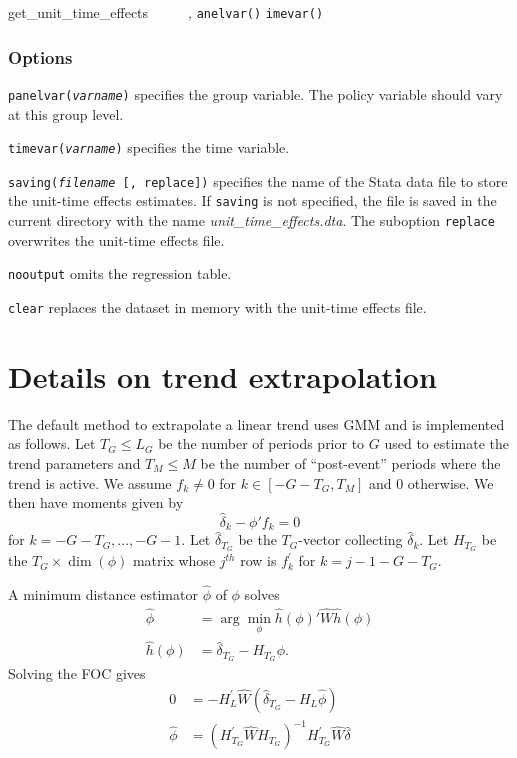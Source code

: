 \documentclass[12pt]{article}
\begin{document}
\begin{stsyntax}
	get\_unit\_time\_effects
	\depvar\
	\optindepvars\
	\optif\
	\optin\
	\optweight\
	\emph{,}
	\texttt{anelvar(\varname)}
	\texttt{imevar(\varname)}\
\end{stsyntax}

\subsubsection{Options}
\hangpara
\texttt{panelvar({\it varname})} specifies the group variable.
The policy variable should vary at this group level.

\hangpara
\texttt{timevar({\it varname})} specifies the time variable.

\hangpara
\texttt{saving({\it filename} [, replace])} specifies the name of the Stata data file to store the unit-time effects estimates.
If \texttt{saving} is not specified, the file is saved in the current directory with the name {\it unit\_time\_effects.dta}.
The suboption \texttt{replace} overwrites the unit-time effects file.

\hangpara
\texttt{nooutput} omits the regression table.

\hangpara
\texttt{clear} replaces the dataset in memory with the unit-time effects file.









\section{Details on trend extrapolation}
\label{sec:app_trend}

The default method to extrapolate a linear trend uses GMM and is implemented as follows.
Let $T_G \leq L_G$ be the number of periods prior to $G$ used to estimate the trend parameters and $T_M \leq M$ be the number of ``post-event'' periods where the trend is active.
We assume $f_k \neq 0$ for $k \in \left[-G-T_G,T_M \right]$ and $0$ otherwise.
We then have moments given by
\[
\widehat{\delta}_{k}-\phi'f_{k}=0
\]
for $k=-G-T_G,...,-G-1$. Let $\widehat{\delta}_{T_G}$ be the $T_{G}$-vector
collecting $\widehat{\delta}_{k}$. Let $H_{T_G}$ be the $T_{G}\times\dim\left(\phi\right)$
matrix whose $j^{th}$ row is $f_{k}^{'}$ for $k=j-1-G-T_{G}$.

A minimum distance estimator $\widehat{\phi}$ of $\phi$ solves
\begin{align*}
\widehat{\phi} & =\arg\min_{\phi}\widehat{h}\left(\phi\right)'\widehat{W}\widehat{h}\left(\phi\right)\\
\widehat{h}\left(\phi\right) & =\widehat{\delta}_{T_G}-H_{T_G}\phi.
\end{align*}
Solving the FOC gives
\[
\begin{array}{rl}
0 & =-H_{L}^{\prime}\widehat{W}(\widehat{\delta}_{T_G}-H_{L}\widehat{\phi})\\
\widehat{\phi} & =(H_{T_G}^{\prime}\widehat{W}H_{T_G})^{-1}H_{T_G}^{\prime}\widehat{W}\widehat{\delta}
\end{array}
\]
\end{document}
